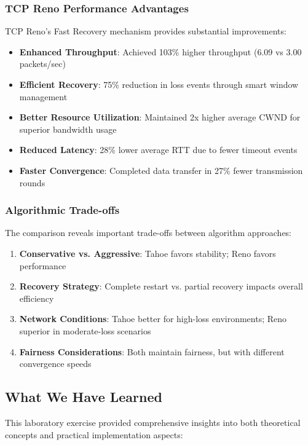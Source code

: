 \documentclass[12pt]{article}
\begin{document}
\subsubsection{TCP Reno Performance Advantages}
TCP Reno's Fast Recovery mechanism provides substantial improvements:

\begin{itemize}
    \item \textbf{Enhanced Throughput}: Achieved 103\% higher throughput (6.09 vs 3.00 packets/sec)
    \item \textbf{Efficient Recovery}: 75\% reduction in loss events through smart window management
    \item \textbf{Better Resource Utilization}: Maintained 2x higher average CWND for superior bandwidth usage
    \item \textbf{Reduced Latency}: 28\% lower average RTT due to fewer timeout events
    \item \textbf{Faster Convergence}: Completed data transfer in 27\% fewer transmission rounds
\end{itemize}

\subsubsection{Algorithmic Trade-offs}
The comparison reveals important trade-offs between algorithm approaches:

\begin{enumerate}
    \item \textbf{Conservative vs. Aggressive}: Tahoe favors stability; Reno favors performance
    \item \textbf{Recovery Strategy}: Complete restart vs. partial recovery impacts overall efficiency
    \item \textbf{Network Conditions}: Tahoe better for high-loss environments; Reno superior in moderate-loss scenarios
    \item \textbf{Fairness Considerations}: Both maintain fairness, but with different convergence speeds
\end{enumerate}

\subsection{What We Have Learned}

This laboratory exercise provided comprehensive insights into both theoretical concepts and practical implementation aspects:
\end{document}
